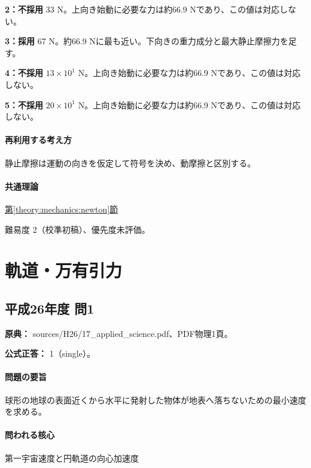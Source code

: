\noindent\textbf{2：不採用} 33 N。上向き始動に必要な力は約66.9 Nであり、この値は対応しない。\par

\noindent\textbf{3：採用} 67 N。約66.9 Nに最も近い。下向きの重力成分と最大静止摩擦力を足す。\par

\noindent\textbf{4：不採用} \(13\times10^1\) N。上向き始動に必要な力は約66.9 Nであり、この値は対応しない。\par

\noindent\textbf{5：不採用} \(20\times10^1\) N。上向き始動に必要な力は約66.9 Nであり、この値は対応しない。\par

\paragraph{再利用する考え方} 静止摩擦は運動の向きを仮定して符号を決め、動摩擦と区別する。

\paragraph{共通理論} \hyperref[theory:mechanics:newton]{第\ref*{theory:mechanics:newton}節}

\par 難易度 2（校準初稿）、優先度未評価。

\section{軌道・万有引力}

\subsection{平成26年度 問1}
\label{q:h26-reg-applied-01}

\noindent\textbf{原典：} sources/H26/17\_applied\_science.pdf、PDF物理1頁。

\textbf{公式正答：} 1（single）。

\paragraph{問題の要旨} 球形の地球の表面近くから水平に発射した物体が地表へ落ちないための最小速度を求める。

\paragraph{問われる核心} 第一宇宙速度と円軌道の向心加速度

